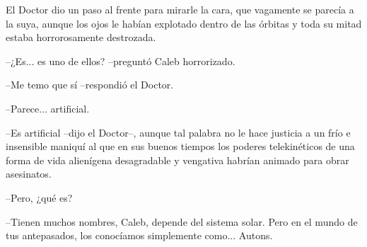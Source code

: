 El Doctor dio un paso al frente para mirarle la cara, que vagamente se parecía a la suya, aunque los ojos le habían explotado dentro de las órbitas y toda su mitad estaba horrorosamente destrozada.
 
--¿Es... es uno de ellos? --preguntó Caleb horrorizado.
 
--Me temo que sí --respondió el Doctor.
 
--Parece... artificial.
 
--Es artificial --dijo el Doctor--, aunque tal palabra no le hace justicia a un frío e insensible maniquí al que en sus buenos tiempos los poderes telekinéticos de una forma de vida alienígena desagradable y vengativa habrían animado para obrar asesinatos.
 
--Pero, ¿qué es?
 
--Tienen muchos nombres, Caleb, depende del sistema solar. Pero en el mundo de tus antepasados, los conocíamos simplemente como... Autons.
